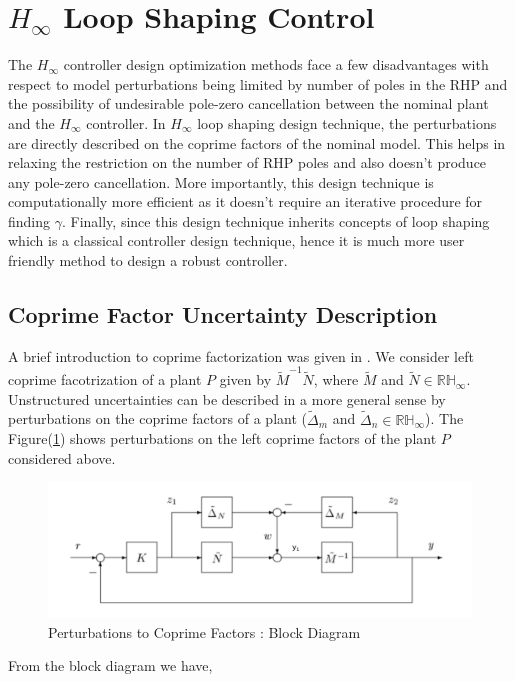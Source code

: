 \documentclass[a4paper,12pt]{article}
\begin{document}
\section{$H_{\infty}$ Loop Shaping Control} The $H_{\infty}$ controller design optimization methods face a few disadvantages with respect to model perturbations being limited by number of poles in the RHP and the possibility of undesirable pole-zero cancellation between the nominal plant and the $H_{\infty}$ controller. In $H_{\infty}$ loop shaping design technique, the perturbations are directly described on the coprime factors of the nominal model. This helps in relaxing the restriction on the number of RHP poles and also doesn't produce any pole-zero cancellation. More importantly, this design technique is computationally more efficient as it doesn't require an iterative procedure for finding $\gamma$. Finally, since this design technique inherits concepts of loop shaping which is a classical controller design technique, hence it is much more user friendly method to design a robust controller.
	\subsection{Coprime Factor Uncertainty Description} A brief introduction to coprime factorization was given in \cite{prev}. We consider left coprime facotrization of a plant $P$ given by $\tilde{M}^{-1}\tilde{N}$, where $\tilde{M}$ and $\tilde{N} \in \mathbb{RH}_{\infty}$. 
% 
%			  
%			  
	Unstructured uncertainties can be described in a more general sense by perturbations on the coprime factors of a plant ($\tilde{\Delta}_{m}$ and $\tilde{\Delta}_{n} \in \mathbb{RH}_{\infty}$). The Figure(\ref{co2}) shows perturbations on the left coprime factors of the plant $P$ considered above. 
		\begin{figure}[H]
			  \centering
			  \includegraphics[scale=0.35]{co12}
%			  
			  \caption{Perturbations to Coprime Factors : Block Diagram}
			 \label{co2}
		\end{figure}	From the block diagram we have,
	
\end{document}
